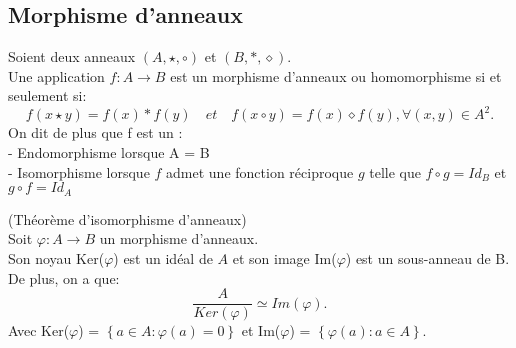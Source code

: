 \subsection{Morphisme d'anneaux}
\begin{madefinition}
	Soient deux anneaux $(A,\star, \circ )$ et $(B, \ast, \diamond)$.\\
	Une application $f:A \longrightarrow B$ est un morphisme d'anneaux  ou homomorphisme si et seulement si:
	\[ f(x \star y) = f(x) \ast f(y) \quad et \quad f(x \circ y) = f(x) \diamond f(y), \forall (x,y) \in A^2.\]
	On dit de plus que f est un :\\
	- Endomorphisme lorsque A = B \\
	- Isomorphisme lorsque $f$ admet une fonction réciproque $g$ telle que $f \circ g = Id_B$ et $g \circ f = Id_A$ 
\end{madefinition}
\begin{maproposition}
	(Théorème d'isomorphisme d’anneaux) \\
	Soit $\varphi:A \longrightarrow B$ un morphisme d'anneaux.\\
	Son noyau Ker($\varphi$) est un idéal de $A$ et son image Im($\varphi$) est un sous-anneau de B.\\ De plus, on a que:
	\[ \dfrac{A}{Ker(\varphi)} \simeq  Im(\varphi).\]
	Avec Ker($\varphi$) = $\left\{a \in A : \varphi(a) = 0 \right\}$ 
	et Im($\varphi$) = $\left\{\varphi(a) : a \in A \right\}$.
\end{maproposition}
